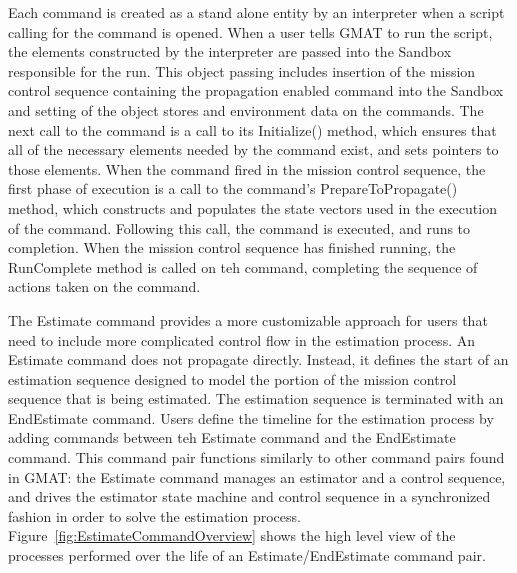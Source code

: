 Each command is created as a stand alone entity by an interpreter when a script calling for the
command is opened.  When a user tells GMAT to run the script, the elements constructed by the
interpreter are passed into the Sandbox responsible for the run.  This object passing includes
insertion of the mission control sequence containing the propagation enabled command into the
Sandbox and setting of the object stores and environment data on the commands. The next call to the
command is a call to its Initialize() method, which ensures that all of the necessary elements
needed by the command exist, and sets pointers to those elements.  When the command fired in the
mission control sequence, the first phase of execution is a call to the command's
PrepareToPropagate() method, which constructs and populates the state vectors used in the execution
of the command.  Following this call, the command is executed, and runs to completion.  When the
mission control sequence has finished running, the RunComplete method is called on teh command,
completing the sequence of actions taken on the command.

The Estimate command provides a more customizable approach for users that need to include more
complicated control flow in the estimation process.  An Estimate command does not propagate
directly.  Instead, it defines the start of an estimation sequence designed to model the portion of
the mission control sequence that is being estimated.  The estimation sequence is terminated with
an EndEstimate command. Users define the timeline for the estimation process by adding commands
between teh Estimate command and the EndEstimate command.  This command pair functions similarly to
other command pairs found in GMAT: the Estimate command manages an estimator and a control
sequence, and drives the estimator state machine and control sequence in a synchronized fashion in
order to solve the estimation process.  Figure~\ref{fig:EstimateCommandOverview} shows the high
level view of the processes performed over the life of an Estimate/EndEstimate command pair.

